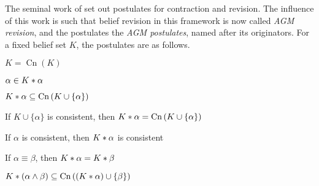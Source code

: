 {The seminal work of \textcite{alchourron1985logic} set out postulates for
contraction and revision. The influence of this work is such that belief
revision in this framework is now called \emph{AGM revision}, and the
postulates the \emph{AGM postulates}, named after its originators. For a fixed
belief set $K$, the postulates are as follows.\footnotemark{}


\newcommand{\cn}[1]{\operatorname{Cn}\left({#1}\right)}

\begin{axiomlist}

    \begin{axiom}
        $K = \cn{K}$
    \end{axiom}

    \begin{axiom}
        $\alpha \in K \ast \alpha$
    \end{axiom}

    \begin{axiom}
        $K \reviseby \alpha \subseteq \cn{K \cup \{\alpha\}}$
    \end{axiom}

    \begin{axiom}
        If $K \cup \{\alpha\}$ is consistent, then $K \reviseby \alpha
        = \cn{K \cup \{\alpha\}}$
    \end{axiom}

    \begin{axiom}
        If $\alpha$ is consistent, then $K \ast \alpha$ is consistent
    \end{axiom}

    \begin{axiom}
        If $\alpha \equiv \beta$, then $K \ast \alpha = K \ast \beta$
    \end{axiom}

    \begin{axiom}
        $K \reviseby (\alpha \land \beta) \subseteq \cn{(K \reviseby \alpha)
        \cup \{\beta\}}$
    \end{axiom}


\end{axiomlist}}
